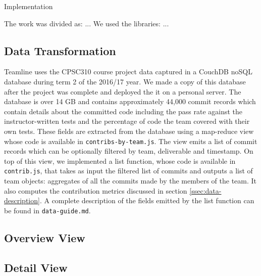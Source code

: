 \documentclass[../manifest.tex]{subfiles}
\begin{document}
Implementation

The work was divided as: ...
We used the libraries: ...

\subsection{Data Transformation}
Teamline uses the CPSC310 course project data captured in a CouchDB noSQL database during term 2 of the 2016/17 year. We made a copy of this database after the project was complete and deployed the it on a personal server. The database is over 14 GB and contains approximately 44,000 commit records which contain details about the committed code including the pass rate against the instructor-written tests and the percentage of code the team covered with their own tests. These fields are extracted from the database using a map-reduce view whose code is available in \texttt{contribs-by-team.js}. The view emits a list of commit records which can be optionally filtered by team, deliverable and timestamp. On top of this view, we implemented a list function, whose code is available in \texttt{contrib.js}, that takes as input the filtered list of commits and outputs a list of team objects: aggregates of all the commits made by the members of the team. It also computes the contribution metrics discussed in section \ref{ssec:data-description}. A complete description of the fields emitted by the list function can be found in \texttt{data-guide.md}.

% 

\subsection{Overview View}
\subsection{Detail View}
\end{document}
